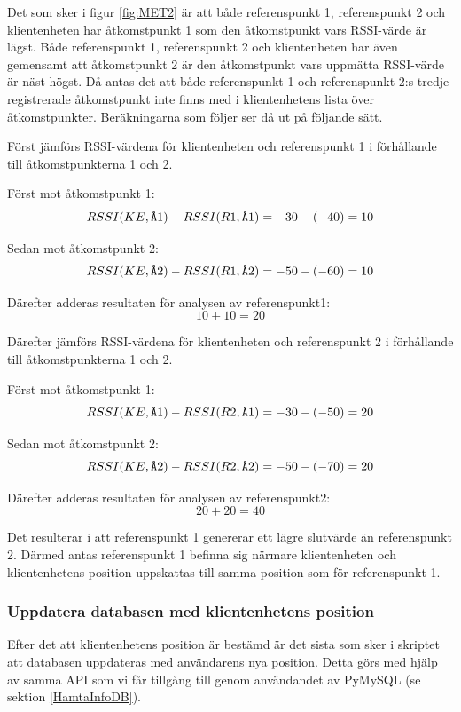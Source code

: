 \documentclass[a4paper,12pt]{article}
\begin{document}
 Det som sker i figur \ref{fig:MET2} är att både referenspunkt 1, referenspunkt 2 och klientenheten har åtkomstpunkt 1 som den åtkomstpunkt vars RSSI-värde är lägst. Både referenspunkt 1, referenspunkt 2 och klientenheten har även gemensamt att åtkomstpunkt 2 är den åtkomstpunkt vars uppmätta RSSI-värde är näst högst. Då antas det att både referenspunkt 1 och referenspunkt 2:s tredje registrerade åtkomstpunkt inte finns med i klientenhetens lista över åtkomstpunkter. Beräkningarna som följer ser då ut på följande sätt.

 Först jämförs RSSI-värdena för klientenheten och referenspunkt 1 i förhållande till åtkomstpunkterna 1 och 2.

 Först mot åtkomstpunkt 1: $$ RSSI (KE,\verb|Å|1)  -  RSSI (R1,\verb|Å|1) = -30 - (- 40) = 10 $$

 Sedan mot åtkomstpunkt 2: $$ RSSI (KE,\verb|Å|2)  -  RSSI (R1,\verb|Å|2) = -50 - (- 60) = 10 $$

 Därefter adderas resultaten för analysen av referenspunkt1: $$ 10 + 10 = 20$$

 Därefter jämförs RSSI-värdena för klientenheten och referenspunkt 2 i förhållande till åtkomstpunkterna 1 och 2.

 Först mot åtkomstpunkt 1: $$ RSSI (KE,\verb|Å|1)  -  RSSI (R2,\verb|Å|1) = -30 - (- 50) = 20 $$

 Sedan mot åtkomstpunkt 2: $$ RSSI (KE,\verb|Å|2)  -  RSSI (R2,\verb|Å|2) = -50 - (- 70) = 20 $$

 Därefter adderas resultaten för analysen av referenspunkt2: $$ 20 + 20 = 40$$

 Det resulterar i att referenspunkt 1 genererar ett lägre slutvärde än referenspunkt 2. Därmed antas referenspunkt 1 befinna sig närmare klientenheten och klientenhetens position uppskattas till samma position som för referenspunkt 1.

 \subsubsection{Uppdatera databasen med klientenhetens position}
 Efter det att klientenhetens position är bestämd är det sista som sker i skriptet att databasen uppdateras med användarens nya position. Detta görs med hjälp av samma API som vi får tillgång till genom användandet av PyMySQL (se sektion \ref{HamtaInfoDB}).
\end{document}
